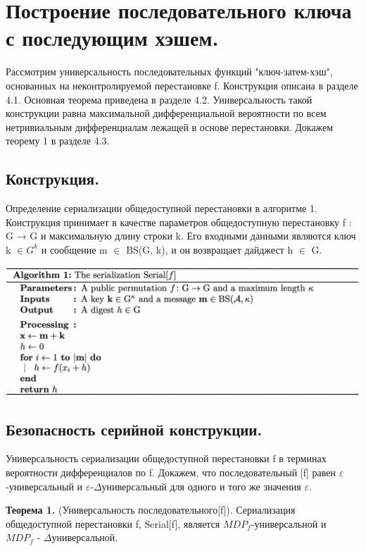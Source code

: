 \documentclass[utf8,14pt,a4paper,oneside,russian]{book}
\begin{document}
\section{Построение последовательного ключа с последующим хэшем.}

Рассмотрим универсальность последовательных функций "ключ-затем-хэш", 
основанных на неконтролируемой перестановке f. Конструкция описана в 
разделе 4.1. Основная теорема приведена в разделе 4.2. Универсальность 
такой конструкции равна максимальной дифференциальной вероятности по 
всем нетривиальным дифференциалам лежащей в основе перестановки. 
Докажем теорему 1 в разделе 4.3.

\subsection{Конструкция.}

Определение сериализации общедоступной перестановки в алгоритме 1. 
Конструкция принимает в качестве параметров общедоступную 
перестановку f : G → G и максимальную длину строки k. 
Его входными данными являются ключ k $\in G^k$ и сообщение m $\in$ BS(G, k), 
и он возвращает дайджест h $\in$ G.

\includegraphics[width=14cm]{form9}

\subsection{Безопасность серийной конструкции.}

Универсальность сериализации общедоступной перестановки f в терминах 
вероятности дифференциалов по f. Докажем, что последовательный [f] равен
$\varepsilon$-универсальный и $\varepsilon$-$\Delta$универсальный для 
одного и того же значения $\varepsilon$.

\textbf{Теорема 1.} (Универсальность последовательного[f]). Сериализация 
общедоступной перестановки f, Serial[f], является $MDP_f$-универсальной и \\
$MDP_f$ - $\Delta$универсальной.
\end{document}
